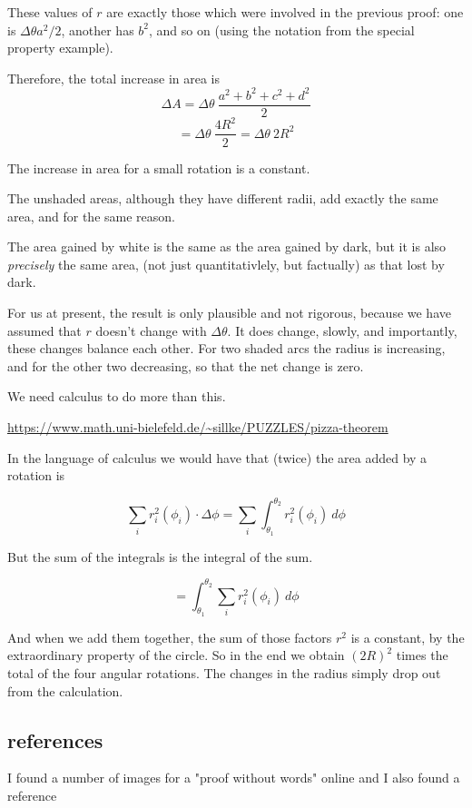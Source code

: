 \documentclass[11pt, oneside]{article}
\begin{document}
These values of $r$ are exactly those which were involved in the previous proof:  one is $\Delta \theta a^2/2$, another has $b^2$, and so on (using the notation from the special property example).

Therefore, the total increase in area is
\[ \Delta A = \Delta \theta \ \frac{a^2 + b^2 + c^2 + d^2}{2} \]
\[ = \Delta \theta \ \frac{4R^2}{2} = \Delta \theta \ 2R^2 \]

The increase in area for a small rotation is a constant.  

The unshaded areas, although they have different radii, add exactly the same area, and for the same reason.

The area gained by white is the same as the area gained by dark, but it is also \emph{precisely} the same area, (not just quantitativlely, but factually) as that lost by dark.

For us at present, the result is only plausible and not rigorous, because we have assumed that $r$ doesn't change with $\Delta \theta$.  It does change, slowly, and importantly, these changes balance each other.  For two shaded arcs the radius is increasing, and for the other two decreasing, so that the net change is zero.

We need calculus to do more than this.

\url{https://www.math.uni-bielefeld.de/~sillke/PUZZLES/pizza-theorem}

In the language of calculus we would have that (twice) the area added by a rotation is

\[ \sum_i r_i^2 (\phi_i) \cdot \Delta \phi = \sum_i  \int_{\theta_1}^{\theta_2} r_i^2 (\phi_i) \ d \phi \]

But the sum of the integrals is the integral of the sum.  

\[ = \int_{\theta_1}^{\theta_2}  \sum_i  r_i^2 (\phi_i) \ d \phi \]

And when we add them together, the sum of those factors $r^2$ is a constant, by the extraordinary property of the circle.  So in the end we obtain $(2R)^2$ times the total of the four angular rotations.  The changes in the radius simply drop out from the calculation.

\subsection*{references}

I found a number of images for a "proof without words" online and I also found a reference
\end{document}

